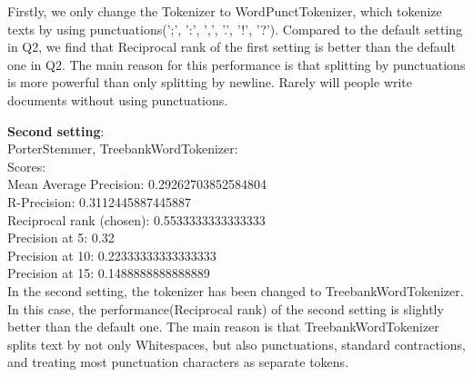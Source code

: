 \documentclass{article}
\begin{document}
Firstly, we only change the Tokenizer to WordPunctTokenizer, which tokenize 
texts by using punctuations(';', ':', ',', '.', '!', '?'). Compared to the 
default setting in Q2, we find that Reciprocal rank of the first setting is 
 better than the default one in Q2. The main reason for this performance 
is that splitting by punctuations is more powerful than only splitting by newline.
Rarely will people write documents without using punctuations.




\noindent
\textbf{Second setting}:\\
PorterStemmer, TreebankWordTokenizer:\\
Scores:\\
Mean Average Precision: 0.29262703852584804\\
R-Precision: 0.3112445887445887\\
Reciprocal rank (chosen): 0.5533333333333333\\
Precision at 5: 0.32\\
Precision at 10: 0.22333333333333333\\
Precision at 15: 0.1488888888888889\\

In the second setting, the tokenizer has been changed to TreebankWordTokenizer. 
In this case, the performance(Reciprocal rank) of the second setting is slightly 
better than the default one. The main reason is that TreebankWordTokenizer splits 
text by not only Whitespaces, but also punctuations, standard 
contractions, and treating most punctuation characters as separate tokens. 
\end{document}
